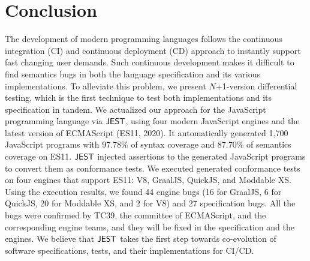 \section{Conclusion}\label{sec:conclude}
The development of modern programming languages follows the continuous integration (CI) and
continuous deployment (CD) approach to instantly support fast changing user demands.
Such continuous development makes it difficult to find semantics bugs
in both the language specification and its various implementations.
To alleviate this problem, we present $N$+1-version differential testing,
which is the first technique to test both implementations and its specification in tandem.
We actualized our approach for the JavaScript programming language via $\tool$,
using four modern JavaScript engines and the latest version of ECMAScript (ES11, 2020).
It automatically generated 1,700 JavaScript programs with 97.78\% of syntax
coverage and 87.70\% of semantics coverage on ES11.  $\tool$ injected assertions
to the generated JavaScript programs to convert them as conformance tests.
We executed generated conformance tests on four engines that support ES11:
V8, GraalJS, QuickJS, and Moddable XS.  Using the execution results,
we found 44 engine bugs (16 for GraalJS, 6 for QuickJS,
20 for Moddable XS, and 2 for V8) and 27 specification bugs.
All the bugs were confirmed by TC39, the committee of ECMAScript, and
the corresponding engine teams, and they will be fixed in the specification and the engines.
We believe that $\tool$ takes the first step towards co-evolution of
software specifications, tests, and their implementations for CI/CD.

